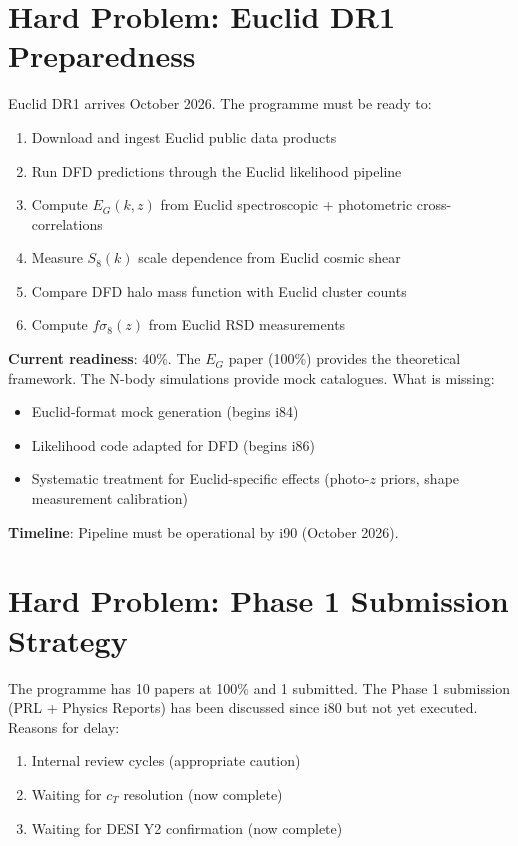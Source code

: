 \documentclass[11pt,a4paper]{article}
\begin{document}
\section{Hard Problem: Euclid DR1 Preparedness}

Euclid DR1 arrives October 2026. The programme must be ready to:
\begin{enumerate}[nosep]
\item Download and ingest Euclid public data products
\item Run DFD predictions through the Euclid likelihood pipeline
\item Compute $E_G(k,z)$ from Euclid spectroscopic + photometric cross-correlations
\item Measure $S_8(k)$ scale dependence from Euclid cosmic shear
\item Compare DFD halo mass function with Euclid cluster counts
\item Compute $f\sigma_8(z)$ from Euclid RSD measurements
\end{enumerate}

\textbf{Current readiness}: 40\%. The $E_G$ paper (100\%) provides the theoretical framework. The N-body simulations provide mock catalogues. What is missing:
\begin{itemize}[nosep]
\item Euclid-format mock generation (begins i84)
\item Likelihood code adapted for DFD (begins i86)
\item Systematic treatment for Euclid-specific effects (photo-$z$ priors, shape measurement calibration)
\end{itemize}

\textbf{Timeline}: Pipeline must be operational by i90 (October 2026).

\section{Hard Problem: Phase 1 Submission Strategy}

The programme has 10 papers at 100\% and 1 submitted. The Phase 1 submission (PRL + Physics Reports) has been discussed since i80 but not yet executed. Reasons for delay:
\begin{enumerate}[nosep]
\item Internal review cycles (appropriate caution)
\item Waiting for $c_T$ resolution (now complete)
\item Waiting for DESI Y2 confirmation (now complete)
\end{enumerate}
\end{document}
